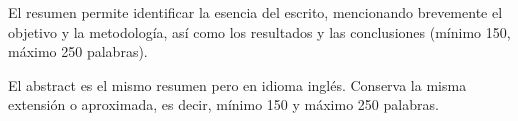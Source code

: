 \sectionCustom{\titleResumen}
El resumen permite identificar la esencia del escrito, mencionando brevemente el objetivo y la metodología, así como los resultados y las conclusiones (mínimo 150, máximo 250 palabras).


\vspace{0.5cm}






\newpage
{}
\sectionCustom{\titleAbstract}
El abstract es el mismo resumen pero en idioma inglés. Conserva la misma extensión o aproximada, es decir, mínimo 150 y máximo 250 palabras.



\vspace{0.5cm}
